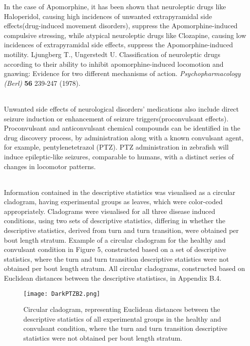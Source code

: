 In the case of Apomorphine, it has been shown that neuroleptic drugs like Haloperidol, causing high incidences of unwanted extrapyramidal side effects(drug-induced movement disorders), suppress the Apomorphine-induced compulsive stressing, while atypical neuroleptic drugs like Clozapine, causing low incidences of extrapyramidal side effects, suppress the Apomorphine-induced motility\cite{ref13}.
Ljungberg T., Ungerstedt U. Classification of neuroleptic drugs according to their ability to inhibit apomorphine-induced locomotion and gnawing: Evidence for two different mechanisms of action. \textit{Psychopharmacology (Berl)} \textbf{56} 239-247 (1978). 





\\Unwanted side effects of neurological disorders' medications also include direct seizure induction or enhancement of seizure triggers(proconvulsant effects). \\Proconvulsant and anticonvulsant chemical compounds can be identified in the drug discovery process, by administration along with a known convulsant agent, for example, pentylenetetrazol (PTZ). PTZ administration in zebrafish will induce epileptic-like seizures, comparable to humans, with a distinct series of changes in locomotor patterns\cite{ref14}.




\\Information contained in the descriptive statistics was  visualised as a circular cladogram, having experimental groups as leaves, which were color-coded appropriately. Cladograms were  visualised for all three disease induced conditions, using two sets of descriptive statistics, differing in whether the descriptive statistics, derived from turn and turn transition, were obtained per bout length stratum. Example of a circular cladogram for the healthy and convulsant condition in Figure 5, constructed based on a set of descriptive statistics, where the turn and turn transition descriptive statistics were not obtained per bout length stratum. All circular cladograms, constructed based on Euclidean distances between the descriptive statistiscs, in Appendix B.4. 
\begin{figure}[h!]
\begin{center}
\texttt{[image: DarkPTZB2.png]}
\caption{Circular cladogram, representing Euclidean distances between the descriptive statistics of all experimental groups in the healthy and convulsant condition, where the turn and turn transition descriptive statistics were not obtained per bout length stratum.}
\end{center}
\end{figure}









